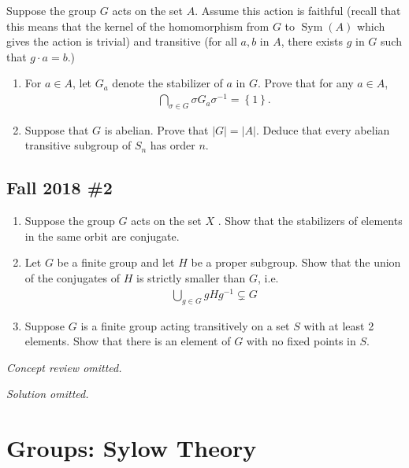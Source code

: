 Suppose the group \(G\) acts on the set \(A\). Assume this action is
faithful (recall that this means that the kernel of the homomorphism
from \(G\) to \(\operatorname{Sym}(A)\) which gives the action is
trivial) and transitive (for all \(a, b\) in \(A\), there exists \(g\)
in \(G\) such that \(g \cdot a = b\).)

\begin{enumerate}
\def\labelenumi{\alph{enumi}.}
\item
  For \(a \in A\), let \(G_a\) denote the stabilizer of \(a\) in \(G\).
  Prove that for any \(a \in A\),
  \begin{align*}
  \displaystyle\bigcap_{\sigma\in G} \sigma G_a \sigma^{-1}= \left\{{1}\right\}
  .\end{align*}
\item
  Suppose that \(G\) is abelian. Prove that \(|G| = |A|\). Deduce that
  every abelian transitive subgroup of \(S_n\) has order \(n\).
\end{enumerate}

\hypertarget{fall-2018-2}{%
\subsection{Fall 2018 \#2}\label{fall-2018-2}}

\begin{enumerate}
\def\labelenumi{\alph{enumi}.}
\item
  Suppose the group \(G\) acts on the set \(X\) . Show that the
  stabilizers of elements in the same orbit are conjugate.
\item
  Let \(G\) be a finite group and let \(H\) be a proper subgroup. Show
  that the union of the conjugates of \(H\) is strictly smaller than
  \(G\), i.e.
  \begin{align*}
  \displaystyle\bigcup_{g\in G} gHg^{-1}\subsetneq G
  \end{align*}
\item
  Suppose \(G\) is a finite group acting transitively on a set \(S\)
  with at least 2 elements. Show that there is an element of \(G\) with
  no fixed points in \(S\).
\end{enumerate}

\emph{Concept review omitted.}

\emph{Solution omitted.}

\hypertarget{groups-sylow-theory}{%
\section{Groups: Sylow Theory}\label{groups-sylow-theory}}

